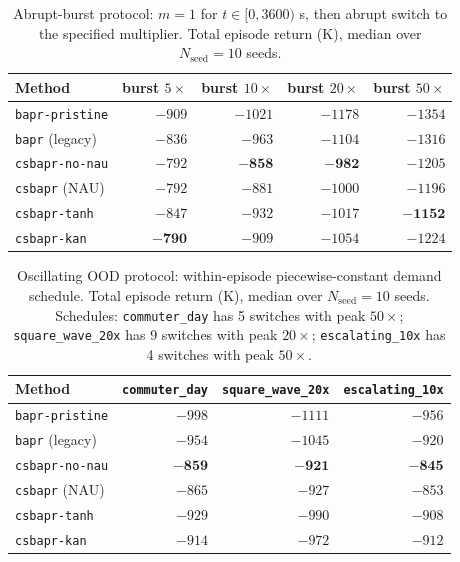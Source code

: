 \documentclass[10pt]{article}
\begin{document}
\begin{table}[htbp]
\centering
\scriptsize
\caption{Abrupt-burst protocol: $m = 1$ for $t \in [0, 3600)$ s, then abrupt switch to the specified multiplier. Total episode return (K), median over $N_{\mathrm{seed}}{=}10$ seeds.}
\label{tab:abrupt}
\begin{tabular}{lrrrr}
\toprule
Method & burst $5{\times}$ & burst $10{\times}$ & burst $20{\times}$ & burst $50{\times}$ \\
\midrule
\texttt{bapr-pristine}    & $-909$  & $-1021$ & $-1178$ & $-1354$ \\
\texttt{bapr} (legacy)    & $-836$  & $-963$  & $-1104$ & $-1316$ \\
\texttt{csbapr-no-nau}    & $-792$ & $\mathbf{-858}$  & $\mathbf{-982}$  & $-1205$ \\
\texttt{csbapr} (NAU)     & $-792$ & $-881$ & $-1000$ & $-1196$ \\
\texttt{csbapr-tanh}      & $-847$  & $-932$  & $-1017$ & $\mathbf{-1152}$ \\
\texttt{csbapr-kan}       & $\mathbf{-790}$  & $-909$  & $-1054$ & $-1224$ \\
\bottomrule
\end{tabular}
\end{table}

\begin{table}[htbp]
\centering
\scriptsize
\caption{Oscillating OOD protocol: within-episode piecewise-constant demand schedule. Total episode return (K), median over $N_{\mathrm{seed}}{=}10$ seeds. Schedules: \texttt{commuter\_day} has 5 switches with peak $50{\times}$; \texttt{square\_wave\_20x} has 9 switches with peak $20{\times}$; \texttt{escalating\_10x} has 4 switches with peak $50{\times}$.}
\label{tab:oscillating}
\begin{tabular}{lrrr}
\toprule
Method & \texttt{commuter\_day} & \texttt{square\_wave\_20x} & \texttt{escalating\_10x} \\
\midrule
\texttt{bapr-pristine}    & $-998$  & $-1111$ & $-956$ \\
\texttt{bapr} (legacy)    & $-954$  & $-1045$ & $-920$ \\
\texttt{csbapr-no-nau}    & $\mathbf{-859}$ & $\mathbf{-921}$ & $\mathbf{-845}$ \\
\texttt{csbapr} (NAU)     & $-865$  & $-927$  & $-853$ \\
\texttt{csbapr-tanh}      & $-929$  & $-990$  & $-908$ \\
\texttt{csbapr-kan}       & $-914$  & $-972$  & $-912$ \\
\bottomrule
\end{tabular}
\end{table}
\end{document}
